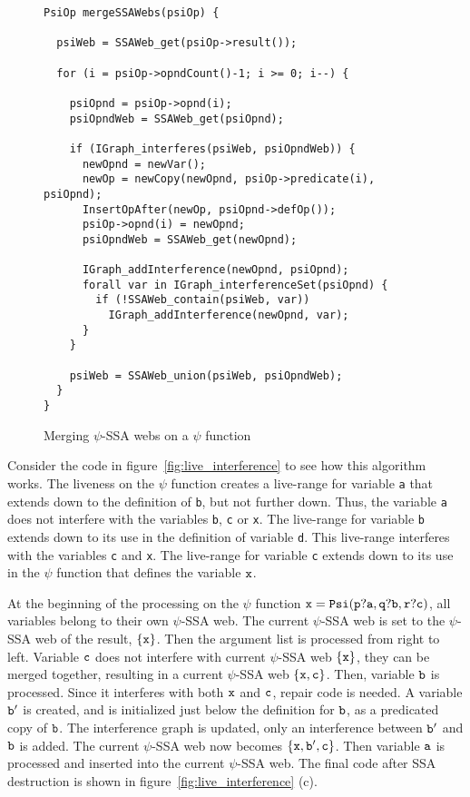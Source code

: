 \begin{figure}
\centering
\footnotesize
\begin{verbatim}
PsiOp mergeSSAWebs(psiOp) {

  psiWeb = SSAWeb_get(psiOp->result());

  for (i = psiOp->opndCount()-1; i >= 0; i--) {

    psiOpnd = psiOp->opnd(i);
    psiOpndWeb = SSAWeb_get(psiOpnd);

    if (IGraph_interferes(psiWeb, psiOpndWeb)) {
      newOpnd = newVar();
      newOp = newCopy(newOpnd, psiOp->predicate(i), psiOpnd);
      InsertOpAfter(newOp, psiOpnd->defOp());
      psiOp->opnd(i) = newOpnd;
      psiOpndWeb = SSAWeb_get(newOpnd);

      IGraph_addInterference(newOpnd, psiOpnd);
      forall var in IGraph_interferenceSet(psiOpnd) {
        if (!SSAWeb_contain(psiWeb, var))
          IGraph_addInterference(newOpnd, var);
      }
    }

    psiWeb = SSAWeb_union(psiWeb, psiOpndWeb);
  }
}

\end{verbatim}
\caption{Merging $\psi$-SSA webs on a $\psi$ function}
\label{fig:pseudo_psi_repair}
\end{figure}


Consider the code in figure~\ref{fig:live_interference} to see how
this algorithm works. The liveness on the $\psi$ function creates a
live-range for variable {\tt a} that extends down to the definition of
{\tt b}, but not further down. Thus, the variable {\tt a} does not
interfere with the variables {\tt b}, {\tt c} or {\tt x}. The
live-range for variable {\tt b} extends down to its use in the
definition of variable {\tt d}. This live-range interferes with the
variables {\tt c} and {\tt x}. The live-range for variable {\tt c}
extends down to its use in the $\psi$ function that defines the
variable ${\tt x}$.

At the beginning of the processing on the $\psi$ function ${\tt x =
  Psi(p?a,q?b,r?c)}$, all variables belong to their own $\psi$-SSA
web. The current $\psi$-SSA web is set to the $\psi$-SSA web of the
result, ${\tt \{x\}}$. Then the argument list is processed from right
to left. Variable ${\tt c}$ does not interfere with current $\psi$-SSA
web ${\tt \{x\}}$, they can be merged together, resulting in a current
$\psi$-SSA web ${\tt \{x, c\}}$. Then, variable ${\tt b}$ is
processed. Since it interferes with both ${\tt x}$ and ${\tt c}$,
repair code is needed. A variable ${\tt b'}$ is created, and is
initialized just below the definition for ${\tt b}$, as a predicated
copy of ${\tt b}$. The interference graph is updated, only an
interference between ${\tt b'}$ and ${\tt b}$ is added. The current
$\psi$-SSA web now becomes ${\tt \{x, b', c\}}$. Then variable ${\tt
  a}$ is processed and inserted into the current $\psi$-SSA web. The
final code after SSA destruction is shown in
figure~\ref{fig:live_interference} (c).


